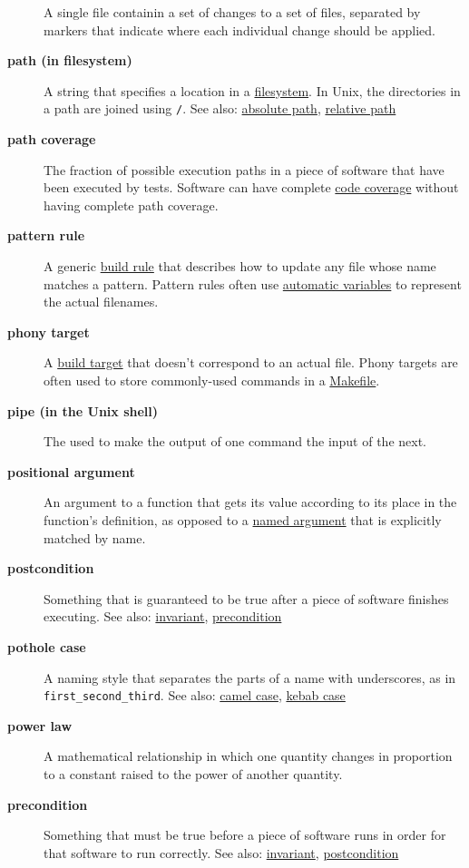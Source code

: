 \documentclass[
]{krantz}
\begin{document}
\begin{description}
A single file containin a set of changes to a set of files, separated by markers that indicate where each individual change should be applied.
\item[\textbf{path (in filesystem)}]
A string that specifies a location in a \protect\hyperlink{filesystem}{filesystem}. In Unix, the directories in a path are joined using \texttt{/}. See also: \protect\hyperlink{absolute_path}{absolute path}, \protect\hyperlink{relative_path}{relative path}
\item[\textbf{path coverage}]
The fraction of possible execution paths in a piece of software that have been executed by tests. Software can have complete \protect\hyperlink{code_coverage}{code coverage} without having complete path coverage.
\item[\textbf{pattern rule}]
A generic \protect\hyperlink{build_rule}{build rule} that describes how to update any file whose name matches a pattern. Pattern rules often use \protect\hyperlink{automatic_variable}{automatic variables} to represent the actual filenames.
\item[\textbf{phony target}]
A \protect\hyperlink{build_target}{build target} that doesn't correspond to an actual file. Phony targets are often used to store commonly-used commands in a \protect\hyperlink{makefile}{Makefile}.
\item[\textbf{pipe (in the Unix shell)}]
The \texttt{\textbar{}} used to make the output of one command the input of the next.
\item[\textbf{positional argument}]
An argument to a function that gets its value according to its place in the function's definition, as opposed to a \protect\hyperlink{named_argument}{named argument} that is explicitly matched by name.
\item[\textbf{postcondition}]
Something that is guaranteed to be true after a piece of software finishes executing. See also: \protect\hyperlink{invariant}{invariant}, \protect\hyperlink{precondition}{precondition}
\item[\textbf{pothole case}]
A naming style that separates the parts of a name with underscores, as in \texttt{first\_second\_third}. See also: \protect\hyperlink{camel_case}{camel case}, \protect\hyperlink{kebab_case}{kebab case}
\item[\textbf{power law}]
A mathematical relationship in which one quantity changes in proportion to a constant raised to the power of another quantity.
\item[\textbf{precondition}]
Something that must be true before a piece of software runs in order for that software to run correctly. See also: \protect\hyperlink{invariant}{invariant}, \protect\hyperlink{postcondition}{postcondition}

\end{description}
\end{document}
